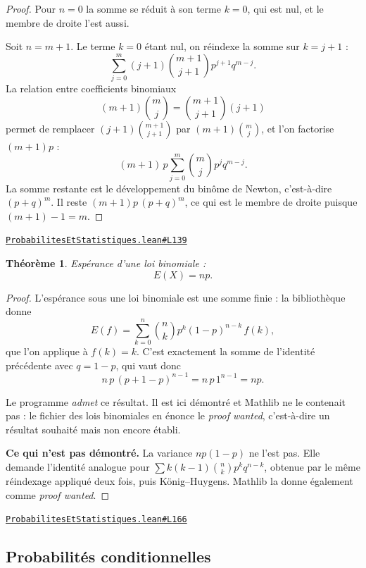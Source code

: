 \documentclass[11pt,a4paper]{article}
\theoremstyle{definition}
\theoremstyle{plain}
\newtheorem{theoreme}{Théorème}
\newcommand{\source}[2]{\par\smallskip\noindent\hfill{\footnotesize\href{#1}{\texttt{#2}}}\par\smallskip}
\begin{document}
\begin{proof}
Pour $n = 0$ la somme se réduit à son terme $k = 0$, qui est nul, et le membre de droite
l'est aussi.

Soit $n = m + 1$. Le terme $k = 0$ étant nul, on réindexe la somme sur $k = j + 1$ :
\[ \sum_{j=0}^{m} (j+1)\binom{m+1}{j+1} p^{j+1} q^{m-j} . \]
La relation entre coefficients binomiaux
\[ (m+1)\binom{m}{j} = \binom{m+1}{j+1}(j+1) \]
permet de remplacer $(j+1)\binom{m+1}{j+1}$ par $(m+1)\binom{m}{j}$, et l'on factorise
$(m+1)p$ :
\[ (m+1)\,p \sum_{j=0}^{m} \binom{m}{j} p^{j} q^{m-j} . \]
La somme restante est le développement du binôme de Newton, c'est-à-dire $(p+q)^{m}$. Il
reste $(m+1)p\,(p+q)^{m}$, ce qui est le membre de droite puisque $(m+1) - 1 = m$.
\end{proof}
\source{https://github.com/Commutator-IO/learn-lean/blob/main/courses/02-lycee/09-probabilites-et-statistiques/ProbabilitesEtStatistiques.lean\#L139}{ProbabilitesEtStatistiques.lean\#L139}

\begin{theoreme}
Espérance d'une loi binomiale :
\[ E(X) = np . \]
\end{theoreme}

\begin{proof}
L'espérance sous une loi binomiale est une somme finie : la bibliothèque donne
\[ E(f) = \sum_{k=0}^{n} \binom{n}{k} p^{k}(1-p)^{n-k}\, f(k) , \]
que l'on applique à $f(k) = k$. C'est exactement la somme de l'identité précédente avec
$q = 1 - p$, qui vaut donc
\[ n\,p\,(p + 1 - p)^{n-1} = n\,p\,1^{n-1} = np . \]

\medskip\noindent
Le programme \emph{admet} ce résultat. Il est ici démontré \textemdash{} et Mathlib ne le
contenait pas : le fichier des lois binomiales en énonce le \emph{proof wanted}, c'est-à-dire
un résultat souhaité mais non encore établi.

\medskip\noindent
\textbf{Ce qui n'est pas démontré.} La variance $np(1-p)$ ne l'est pas. Elle demande
l'identité analogue pour $\sum k(k-1)\binom{n}{k}p^{k}q^{n-k}$, obtenue par le même
réindexage appliqué deux fois, puis König--Huygens. Mathlib la donne également comme
\emph{proof wanted}.
\end{proof}
\source{https://github.com/Commutator-IO/learn-lean/blob/main/courses/02-lycee/09-probabilites-et-statistiques/ProbabilitesEtStatistiques.lean\#L166}{ProbabilitesEtStatistiques.lean\#L166}

\subsection{Probabilités conditionnelles}
\end{document}
